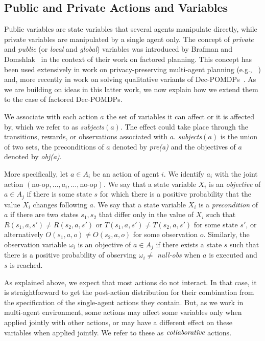 \documentclass[letterpaper]{article} %
\begin{document}
\subsection{Public and Private Actions and Variables}

Public variables are state variables that several agents manipulate directly, while private variables are manipulated by a single agent only. 
The concept of \emph{private} and \emph{public} (or \emph{local} and \emph{global}) variables was introduced by
Brafman and Domshlak~\cite{} in the context of their work on factored planning. This concept has been used extensively
in work on privacy-preserving multi-agent planning (e.g., ~\cite{}) and, more recently in work on solving qualitative variants of Dec-POMDPs~\cite{}. As we are building on ideas in this latter work, we now explain how we extend them to the
case of factored Dec-POMDPs.

We associate with each action $a$ the set of variables it can affect or it is affected by, which we refer to as  {\em subjects}$(a)$. The effect could take place through the transitions, rewards, or observations associated with $a$. {\em subjects}$(a)$ is the union of two sets, the preconditions of $a$ denoted by {\em pre(a)} and the objectives of $a$ denoted by {\em obj(a)}. 

More specifically, let $a\in A_i$ be an action of agent $i$. We identify $a_i$ with the joint action $(\mbox{no-op},\ldots, a_i,\ldots,\mbox{no-op})$.
We say that a state variable $X_i$ is an {\em objective} of $a\in A_j$ if there is some state $s$ for which there is a positive probability that the value 
$X_i$ changes following $a$. We say that a state variable $X_i$ is a {\em precondition} of $a$ if there are two states $s_1,s_2$ that differ only in the value of $X_i$ such that $R(s_1,a,s')\neq R(s_2,a,s')$ or $T(s_1,a,s')\neq T(s_2,a,s')$ for some state $s'$, or alternatively $O(s_1,a,o)\neq O(s_2,a,o)$ for some observation $o$.
Similarly, the observation variable $\omega_i$ is an objective of $a\in A_j$ if there exists a state $s$ such that there is a positive probability
of observing $\omega_i \neq$ {\em null-obs} when $a$ is executed and $s$ is reached.

As explained above, we expect that most actions do not interact. In that case, it is straightforward to get the post-action distribution for their combination from the specification of the single-agent actions they contain. But, as we work in multi-agent environment, some actions may affect some variables only when applied jointly with other actions, or may have a different effect on these variables when applied jointly.
We refer to these as $\emph{collaborative}$ actions. 
\end{document}
